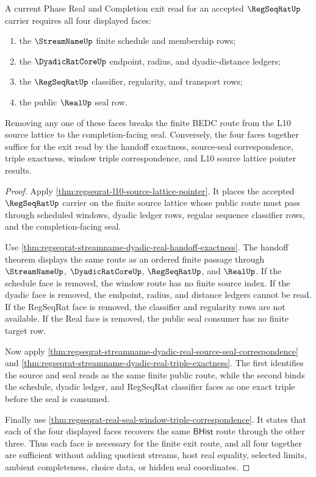\begin{theorem}
\label{thm:regseqrat-l10-four-face-necessity}
A current Phase Real and Completion exit read for an accepted $\RegSeqRatUp$
carrier requires all four displayed faces:
\begin{enumerate}
\item the $\StreamNameUp$ finite schedule and membership rows;
\item the $\DyadicRatCoreUp$ endpoint, radius, and dyadic-distance ledgers;
\item the $\RegSeqRatUp$ classifier, regularity, and transport rows;
\item the public $\RealUp$ seal row.
\end{enumerate}
Removing any one of these faces breaks the finite BEDC route from the L10
source lattice to the completion-facing seal. Conversely, the four faces
together suffice for the exit read by the handoff exactness, source-seal
correspondence, triple exactness, window triple correspondence, and L10 source
lattice pointer results.
\end{theorem}
\begin{proof}
Apply \autoref{thm:regseqrat-l10-source-lattice-pointer}. It places the
accepted $\RegSeqRatUp$ carrier on the finite source lattice whose public
route must pass through scheduled windows, dyadic ledger rows, regular
sequence classifier rows, and the completion-facing seal.

Use \autoref{thm:regseqrat-streamname-dyadic-real-handoff-exactness}. The
handoff theorem displays the same route as an ordered finite passage through
$\StreamNameUp$, $\DyadicRatCoreUp$, $\RegSeqRatUp$, and $\RealUp$. If the
schedule face is removed, the window route has no finite source index. If the
dyadic face is removed, the endpoint, radius, and distance ledgers cannot be
read. If the RegSeqRat face is removed, the classifier and regularity rows are
not available. If the Real face is removed, the public seal consumer has no
finite target row.

Now apply
\autoref{thm:regseqrat-streamname-dyadic-real-source-seal-correspondence} and
\autoref{thm:regseqrat-streamname-dyadic-real-triple-exactness}. The first
identifies the source and seal reads as the same finite public route, while
the second binds the schedule, dyadic ledger, and RegSeqRat classifier faces
as one exact triple before the seal is consumed.

Finally use
\autoref{thm:regseqrat-real-seal-window-triple-correspondence}. It states that
each of the four displayed faces recovers the same $\mathsf{BHist}$ route
through the other three. Thus each face is necessary for the finite exit
route, and all four together are sufficient without adding quotient streams,
host real equality, selected limits, ambient completeness, choice data, or
hidden seal coordinates.
\end{proof}

